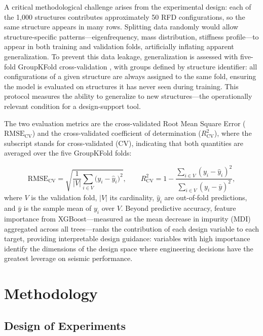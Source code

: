 \documentclass[preprint,12pt,authoryear]{elsarticle}
\newcommand{\RMSE}{\mathrm{RMSE_{CV}}}
\newcommand{\Rsq}{R^{2}_{\mathrm{CV}}}
\begin{document}
A critical methodological challenge arises from the experimental design: each of the 1,000 structures contributes approximately 50 RFD configurations, so the same structure appears in many rows. Splitting data randomly would allow structure-specific patterns---eigenfrequency, mass distribution, stiffness profile---to appear in both training and validation folds, artificially inflating apparent generalization. To prevent this data leakage, generalization is assessed with five-fold GroupKFold cross-validation \citep{Kazemi2022}, with groups defined by structure identifier: all configurations of a given structure are always assigned to the same fold, ensuring the model is evaluated on structures it has never seen during training. This protocol measures the ability to generalize to new structures---the operationally relevant condition for a design-support tool.

The two evaluation metrics are the cross-validated Root Mean Square Error ($\mathrm{RMSE_{CV}}$) and the cross-validated coefficient of determination ($R^2_{\mathrm{CV}}$), where the subscript stands for cross-validated (CV), indicating that both quantities are averaged over the five GroupKFold folds:

\begin{equation}
	\RMSE = \sqrt{\frac{1}{|V|}\sum_{i \in V}\bigl(y_i - \hat{y}_i\bigr)^2},
	\qquad
	\Rsq  = 1 - \frac{\sum_{i \in V}(y_i - \hat{y}_i)^2}
	{\sum_{i \in V}(y_i - \bar{y})^2},
	\label{eq:metrics}
\end{equation}
where $V$ is the validation fold, $|V|$ its cardinality, $\hat{y}_i$ are out-of-fold predictions, and $\bar{y}$ is the sample mean of $y_i$ over $V$. Beyond predictive accuracy, feature importance from XGBoost---measured as the mean decrease in impurity (MDI) aggregated across all trees---ranks the contribution of each design variable to each target, providing interpretable design guidance: variables with high importance identify the dimensions of the design space where engineering decisions have the greatest leverage on seismic performance.

\section{Methodology}
\label{sec:method}

\subsection{Design of Experiments}
\label{sec:method:doe}
\end{document}
